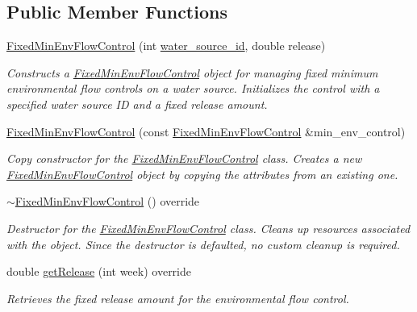 \subsection*{Public Member Functions}
\begin{DoxyCompactItemize}
\item 
\mbox{\hyperlink{classFixedMinEnvFlowControl_ab03711220b87d6490a4c2ca81fcc89a0}{Fixed\+Min\+Env\+Flow\+Control}} (int \mbox{\hyperlink{classMinEnvFlowControl_aada518a047598f386daec1d0358023aa}{water\+\_\+source\+\_\+id}}, double release)
\begin{DoxyCompactList}\small\item\em Constructs a {\ttfamily \mbox{\hyperlink{classFixedMinEnvFlowControl}{Fixed\+Min\+Env\+Flow\+Control}}} object for managing fixed minimum environmental flow controls on a water source. Initializes the control with a specified water source ID and a fixed release amount. \end{DoxyCompactList}\item 
\mbox{\hyperlink{classFixedMinEnvFlowControl_a57795231f747cae4a4b5b4cf9d4d044f}{Fixed\+Min\+Env\+Flow\+Control}} (const \mbox{\hyperlink{classFixedMinEnvFlowControl}{Fixed\+Min\+Env\+Flow\+Control}} \&min\+\_\+env\+\_\+control)
\begin{DoxyCompactList}\small\item\em Copy constructor for the {\ttfamily \mbox{\hyperlink{classFixedMinEnvFlowControl}{Fixed\+Min\+Env\+Flow\+Control}}} class. Creates a new {\ttfamily \mbox{\hyperlink{classFixedMinEnvFlowControl}{Fixed\+Min\+Env\+Flow\+Control}}} object by copying the attributes from an existing one. \end{DoxyCompactList}\item 
\mbox{\hyperlink{classFixedMinEnvFlowControl_ac63298347dcaccf755ea45d1e2f94bad}{$\sim$\+Fixed\+Min\+Env\+Flow\+Control}} () override
\begin{DoxyCompactList}\small\item\em Destructor for the {\ttfamily \mbox{\hyperlink{classFixedMinEnvFlowControl}{Fixed\+Min\+Env\+Flow\+Control}}} class. Cleans up resources associated with the object. Since the destructor is defaulted, no custom cleanup is required. \end{DoxyCompactList}\item 
double \mbox{\hyperlink{classFixedMinEnvFlowControl_af3ef98eef6a7124738a3b54dcadf757f}{get\+Release}} (int week) override
\begin{DoxyCompactList}\small\item\em Retrieves the fixed release amount for the environmental flow control. \end{DoxyCompactList}\end{DoxyCompactItemize}
